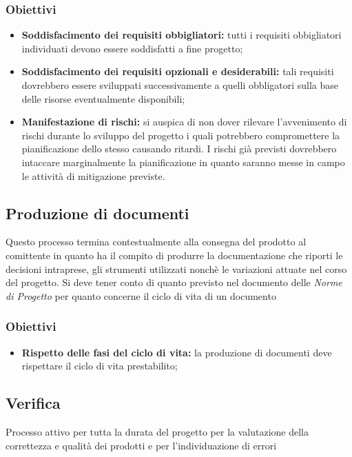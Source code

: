  

\subsubsection{Obiettivi}
\begin{itemize}
    \item \textbf{Soddisfacimento dei requisiti obbigliatori:} tutti i requisiti obbigliatori individuati devono essere soddisfatti a fine progetto;
    \item \textbf{Soddisfacimento dei requisiti opzionali e desiderabili:} tali requisiti dovrebbero essere sviluppati successivamente a quelli obbligatori sulla base delle 
    risorse eventualmente disponibili;
    \item \textbf{Manifestazione di rischi:} si auspica di non dover rilevare l'avvenimento di rischi durante lo sviluppo del progetto i quali potrebbero compromettere
    la pianificazione dello stesso causando ritardi. I rischi già previsti dovrebbero intaccare marginalmente la pianificazione in quanto saranno messe in campo le attività
    di mitigazione previste.
\end{itemize}



\subsection{Produzione di documenti}
Questo processo termina contestualmente alla consegna del prodotto al comittente in quanto ha il compito di produrre la documentazione che riporti le decisioni intraprese,
gli strumenti utilizzati nonchè le variazioni attuate nel corso del progetto. Si deve tener conto di quanto previsto nel documento delle \textit{Norme di Progetto} per quanto 
concerne il ciclo di vita di un documento


\subsubsection{Obiettivi}
\begin{itemize}
    \item \textbf{Rispetto delle fasi del ciclo di vita:} la produzione di documenti deve rispettare il ciclo di vita prestabilito;
  
\end{itemize}


\subsection{Verifica}
Processo attivo per tutta la durata del progetto per la valutazione della correttezza e qualità dei prodotti e per l'individuazione di errori 

